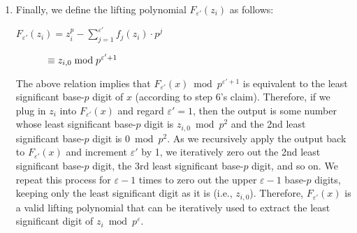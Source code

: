 \begin{enumerate}
\begin{myproof}
$ $

Now, given step 5's claim ($z_i^p \equiv z_{i,0} + \sum\limits_{j=1}^{\varepsilon'}f_j(z_{i,0})\cdot p^j \bmod p^{\varepsilon'+1}$), we can derive the following:

$z_i^p - \sum\limits_{j=1}^{\varepsilon'}f_j(z_{i})\cdot p^j \bmod p^{\varepsilon' + 1}$

$\equiv (z_{i,0} + \sum\limits_{j=1}^{\varepsilon'}f_j(z_{i,0})\cdot p^j) - \sum\limits_{j=1}^{\varepsilon'}f_j(z_{i})\cdot p^j \bmod p^{\varepsilon' + 1}$ \textcolor{red}{ $\rhd$ applying step 5's claim}

$\equiv (z_{i,0} + \sum\limits_{j=1}^{\varepsilon'}f_j(z_i)\cdot p^j) - \sum\limits_{j=1}^{\varepsilon'}f_j(z_i)\cdot p^j \bmod p^{\varepsilon' + 1}$ \textcolor{red}{ $\rhd$ applying $f_j(z_{i,0})\cdot p^j \equiv f_j(z_i)\cdot p^j \bmod p^{\varepsilon' + 1}$}

$\equiv z_{i,0} \bmod p^{\varepsilon' + 1}$

\end{myproof}

\item Finally, we define the lifting polynomial $F_{\varepsilon'}(z_i)$ as follows:

$F_{\varepsilon'}(z_i) = z_i^p - \sum\limits_{j=1}^{\varepsilon'}f_j(z_i)\cdot p^j$

$\textcolor{white}{F_{\varepsilon'}(z_i) } \equiv z_{i,0} \bmod p^{\varepsilon' + 1}$


The above relation implies that $F_{\varepsilon'}(x) \bmod p^{\varepsilon'+1}$ is equivalent to the least significant base-$p$ digit of $x$ (according to step 6's claim). Therefore, if we plug in $z_i$ into $F_{\varepsilon'}(x)$ and regard $\varepsilon' = 1$, then the output is some number whose least significant base-$p$ digit is $z_{i,0} \bmod p^2$ and the 2nd least significant base-$p$ digit is $0 \bmod p^2$. As we recursively apply the output back to $F_{\varepsilon'}(x)$ and increment $\varepsilon'$ by 1, we iteratively zero out the 2nd least significant base-$p$ digit, the 3rd least significant base-$p$ digit, and so on. We repeat this process for $\varepsilon-1$ times to zero out the upper $\varepsilon-1$ base-$p$ digits, keeping only the least significant digit as it is (i.e., $z_{i,0}$). Therefore, $F_{\varepsilon'}(x)$ is a valid lifting polynomial that can be iteratively used to extract the least significant digit of $z_i \bmod p^\varepsilon$. 


\end{enumerate}

